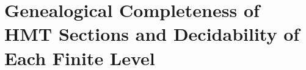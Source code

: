 \chapter{Genealogical Completeness of HMT Sections and Decidability of Each Finite Level}
\label{chap:p3-final:53:completitud_finita}


